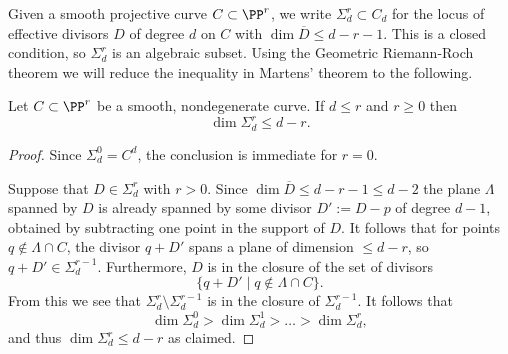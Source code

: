 Given 
a smooth projective curve $C \subset \PP^r$, we write $\Sigma^r_d \subset C_d$ for the locus of effective divisors $D$ of degree $d$ on $C$ with $\dim \overline D \leq d-r-1$. This is a closed condition, so
$\Sigma^r_d$ is an algebraic subset. Using the Geometric Riemann-Roch theorem
we will reduce the inequality in Martens' theorem to the following.

\begin{lemma}\label{elementary secant plane lemma}
Let $C \subset \PP^r$ be a smooth, nondegenerate curve. If $d \leq r$ and $r \geq 0$ then
$$
\dim \Sigma^r_d \leq d-r.
$$
\end{lemma}

\begin{proof}
Since $\Sigma^0_d = C^d$, the conclusion is immediate for $r=0$.

Suppose that  $D\in \Sigma^r_d$ with $r>0$. Since $\dim \overline D\leq d-r-1\leq d-2$ the plane
$\Lambda$ spanned by $D$ is already spanned by some divisor  $D' := D -p$ of degree $d-1$, 
obtained by subtracting one point  in the support of $D$.
It follows that for points $q\notin \Lambda \cap C$, the divisor $q+D'$ spans a plane of dimension $\leq d-r$, 
so $q+D'\in \Sigma^{r-1}_{d}.$
Furthermore,  $D$ is in the closure of the set of divisors
$$
\{q+D' \mid q\notin \Lambda \cap C \}.
$$
From this we see that $\Sigma^r_d\setminus \Sigma^{r-1}_d$ is in the closure of  $\Sigma^{r-1}_d$. It follows that 
$$
\dim \Sigma^0_d >  \dim \Sigma^1_d > \dots > \dim \Sigma^r_d,
$$ 
and thus $\dim \Sigma^r_d \leq d-r$ as claimed.
\end{proof}



